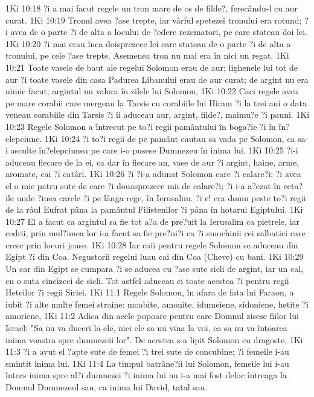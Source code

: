 1Ki 10:18  ?i a mai facut regele un tron mare de os de filde?, ferecându-l cu aur curat.
1Ki 10:19  Tronul avea ?ase trepte, iar vârful spetezei tronului era rotund; ?i avea de o parte ?i de alta a locului de ?edere rezematori, pe care stateau doi lei.
1Ki 10:20  ?i mai erau înca doisprezece lei care stateau de o parte ?i de alta a tronului, pe cele ?ase trepte. Asemenea tron nu mai era în nici un regat.
1Ki 10:21  Toate vasele de baut ale regelui Solomon erau de aur; lighenele lui tot de aur ?i toate vasele din casa Padurea Libanului erau de aur curat; de argint nu era nimic facut; argintul nu valora în zilele lui Solomon,
1Ki 10:22  Caci regele avea pe mare corabii care mergeau la Tarsis cu corabiile lui Hiram ?i la trei ani o data veneau corabiile din Tarsis ?i îi aduceau aur, argint, filde?, maimu?e ?i pauni.
1Ki 10:23  Regele Solomon a întrecut pe to?i regii pamântului în boga?ie ?i în în?elepciune.
1Ki 10:24  ?i to?i regii de pe pamânt cautau sa vada pe Solomon, ca sa-i asculte în?elepciunea pe care i-o pusese Dumnezeu în inima lui.
1Ki 10:25  ?i-i aduceau fiecare de la ei, ca dar în fiecare an, vase de aur ?i argint, haine, arme, aromate, cai ?i catâri.
1Ki 10:26  ?i ?i-a adunat Solomon care ?i calare?i; ?i avea el o mie patru sute de care ?i douasprezece mii de calare?i; ?i i-a a?ezat în ceta?ile unde ?inea carele ?i pe lânga rege, în Ierusalim. ?i e! era domn peste to?i regii de la râul Eufrat pâna la pamântul Filistenilor ?i pâna în hotarul Egiptului.
1Ki 10:27  El a facut ca argintul sa fie tot a?a de pre?uit la Ierusalim ca pietrele, iar cedrii, prin mul?imea lor i-a facut sa fie pre?ui?i ca ?i smochinii cei salbatici care cresc prin locuri joase.
1Ki 10:28  Iar caii pentru regele Solomon se aduceau din Egipt ?i din Coa. Negustorii regelui luau cai din Coa (Cheve) cu bani.
1Ki 10:29  Un car din Egipt se cumpara ?i se aducea cu ?ase sute sicli de argint, iar un cal, cu o suta cincizeci de sicli. Tot astfel aduceau ei toate acestea ?i pentru regii Heteilor ?i regii Siriei.
1Ki 11:1  Regele Solomon, în afara de fata lui Faraon, a iubit ?i alte multe femei straine: moabite, amonite, idumeiene, sidoniene, hetite ?i amoriene,
1Ki 11:2  Adica din acele popoare pentru care Domnul zisese fiilor lui Israel: "Sa nu va duceri la ele, nici ele sa nu vina la voi, ca sa nu va întoarca inima voastra spre dumnezeii lor". De acestea s-a lipit Solomon cu dragoste.
1Ki 11:3  ?i a avut el ?apte sute de femei ?i trei sute de concubine; ?i femeile i-au smintit inima lui.
1Ki 11:4  La timpul batrâne?ii lui Solomon, femeile lui i-au întors inima spre al?i dumnezei ?i inima lui nu i-a mai fost deloc întreaga la Domnul Dumnezeul sau, ca inima lui David, tatal sau.
